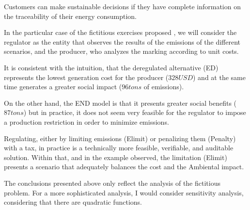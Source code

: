 \documentclass{article}
\begin{document}
Customers can make sustainable decisions if they have complete information on the traceability of their energy consumption.

In the particular case of the fictitious exercises proposed \cite{soroudi_power_2017} , we will consider the regulator as the entity that observes the results of the emissions of the different scenarios, and the producer, who analyzes the marking according to unit costs.

It is consistent with the intuition, that the deregulated alternative (ED) represents the lowest generation cost for the producer ($328 USD$) and at the same time generates a greater social impact ($96 tons$ of emissions).

On the other hand, the END model is that it presents greater social benefits ($87 tons$) but in practice, it does not seem very feasible for the regulator to impose a production restriction in order to minimize emissions.

Regulating, either by limiting emissions (Elimit) or penalizing them (Penalty) with a tax, in practice is a technically more feasible, verifiable, and auditable solution. Within that, and in the example observed, the limitation (Elimit) presents a scenario that adequately balances the cost and the Ambiental impact.

The conclusions presented above only reflect the analysis of the fictitious problem. For a more sophisticated analysis, I would consider sensitivity analysis, considering that there are quadratic functions.

  \nocite{*}
    
\end{document}
